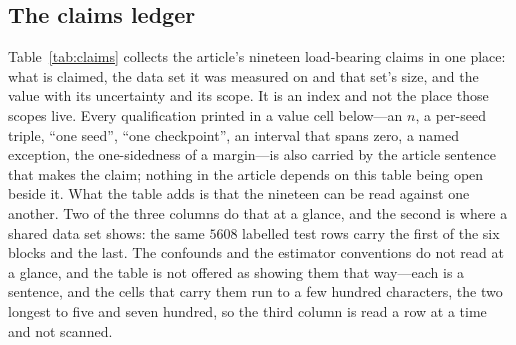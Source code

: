 %
\subsection{The claims ledger}
\label{sec:si-ledger}
Table~\ref{tab:claims} collects the article's nineteen load-bearing claims in one place: what is
claimed, the data set it was measured on and that set's size, and the value with its uncertainty and
its scope. It is an index and not the place those scopes live. Every qualification printed in a value
cell below---an $n$, a per-seed triple, ``one seed'', ``one checkpoint'', an interval that spans
zero, a named exception, the one-sidedness of a margin---is also carried by the article sentence that
makes the claim; nothing in the article depends on this table being
open beside it. What the table adds is that the nineteen can be read against one another. Two of the
three columns do that at a glance, and the second is where a shared data set shows: the same $5608$
labelled test rows carry the first of the six blocks and the last. The confounds and the estimator
conventions do not read at a glance, and the table is not offered as showing them that way---each is
a sentence, and the cells that carry them run to a few hundred characters, the two longest to five
and seven hundred, so the third column is read a row at a time and not scanned.

